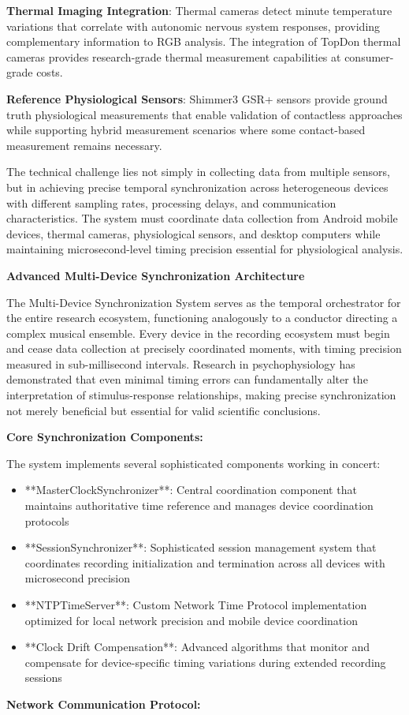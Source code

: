 \documentclass[12pt,a4paper]{report}
\begin{document}
\textbf{Thermal Imaging Integration}: Thermal cameras detect minute temperature variations that correlate with autonomic
nervous system responses, providing complementary information to RGB analysis. The integration of TopDon thermal cameras
provides research-grade thermal measurement capabilities at consumer-grade costs.

\textbf{Reference Physiological Sensors}: Shimmer3 GSR+ sensors provide ground truth physiological measurements that enable
validation of contactless approaches while supporting hybrid measurement scenarios where some contact-based measurement
remains necessary.

The technical challenge lies not simply in collecting data from multiple sensors, but in achieving precise temporal
synchronization across heterogeneous devices with different sampling rates, processing delays, and communication
characteristics. The system must coordinate data collection from Android mobile devices, thermal cameras, physiological
sensors, and desktop computers while maintaining microsecond-level timing precision essential for physiological
analysis.

\textbf{Advanced Multi-Device Synchronization Architecture}

The Multi-Device Synchronization System serves as the temporal orchestrator for the entire research ecosystem,
functioning analogously to a conductor directing a complex musical ensemble. Every device in the recording ecosystem
must begin and cease data collection at precisely coordinated moments, with timing precision measured in sub-millisecond
intervals. Research in psychophysiology has demonstrated that even minimal timing errors can fundamentally alter the
interpretation of stimulus-response relationships, making precise synchronization not merely beneficial but essential
for valid scientific conclusions.

\textbf{Core Synchronization Components:}

The system implements several sophisticated components working in concert:

\begin{itemize}
\item **MasterClockSynchronizer**: Central coordination component that maintains authoritative time reference and manages
  device coordination protocols
\item **SessionSynchronizer**: Sophisticated session management system that coordinates recording initialization and
  termination across all devices with microsecond precision
\item **NTPTimeServer**: Custom Network Time Protocol implementation optimized for local network precision and mobile device
  coordination
\item **Clock Drift Compensation**: Advanced algorithms that monitor and compensate for device-specific timing variations
  during extended recording sessions

\end{itemize}
\textbf{Network Communication Protocol:}
\end{document}
